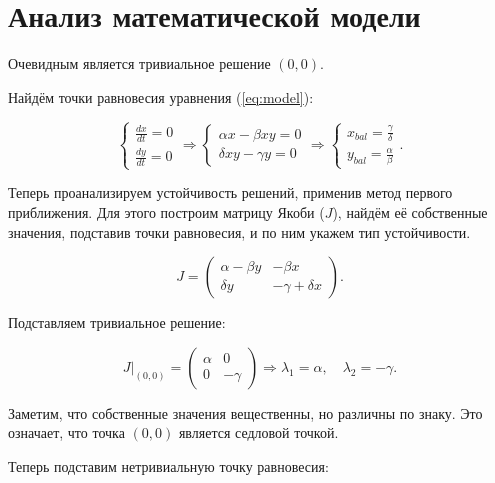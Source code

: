 \chapter{Анализ математической модели}

Очевидным является тривиальное решение $(0,0)$.

Найдём точки равновесия уравнения (\ref{eq:model}):

\begin{equation} 
	\begin{cases} 
		\frac{dx}{dt} = 0 \\ 
		\frac{dy}{dt} = 0 
	\end{cases} 
	\Rightarrow 
	\begin{cases} 
		\alpha x - \beta x y = 0\\ 
		\delta x y - \gamma y = 0 \end{cases} 
		\Rightarrow 
		\begin{cases} 
			x_{bal} = \frac{\gamma}{\delta}\\ 
			y_{bal} = \frac{\alpha}{\beta} 
		\end{cases}. 
		\label{eq:balance_points} 
\end{equation}

Теперь проанализируем устойчивость решений, применив метод первого приближения.
Для этого построим матрицу Якоби (\textbf{$J$}), найдём её собственные значения, подставив точки равновесия, и по ним укажем тип устойчивости.

\begin{equation} 
	J = \begin{pmatrix} \alpha - \beta y & - \beta x \\ \delta y & - \gamma + \delta x 
	\end{pmatrix}. \label{eq:jacobi} \end{equation}

Подставляем тривиальное решение:

\begin{equation} J\big|_{(0,0)} = \begin{pmatrix} \alpha & 0 \\ 0 & -\gamma \end{pmatrix} \Rightarrow \lambda_1 = \alpha, \quad \lambda_2 = -\gamma. \label{eq:EV_triv} \end{equation}

Заметим, что собственные значения вещественны, но различны по знаку.
Это означает, что точка $(0,0)$ является седловой точкой.

Теперь подставим нетривиальную точку равновесия:


